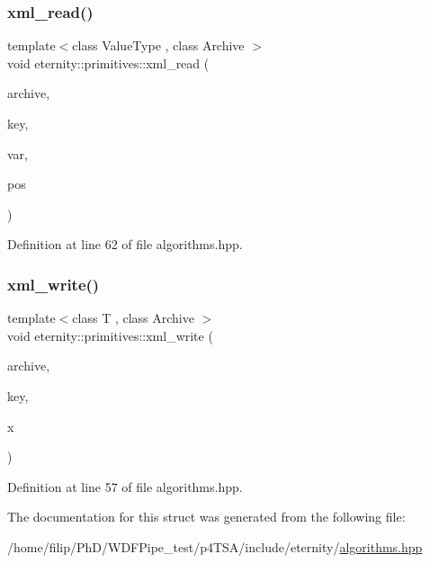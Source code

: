 \subsubsection{\texorpdfstring{xml\+\_\+read()}{xml\_read()}}
{\footnotesize\ttfamily template$<$class Value\+Type , class Archive $>$ \\
void eternity\+::primitives\+::xml\+\_\+read (\begin{DoxyParamCaption}\item[{Archive \&}]{archive,  }\item[{std\+::string}]{key,  }\item[{Value\+Type $\ast$}]{var,  }\item[{size\+\_\+t}]{pos }\end{DoxyParamCaption})}



Definition at line 62 of file algorithms.\+hpp.

\mbox{\label{structeternity_1_1primitives_af5a6a3550f36eb25ad9372989614f162}} 
\subsubsection{\texorpdfstring{xml\+\_\+write()}{xml\_write()}}
{\footnotesize\ttfamily template$<$class T , class Archive $>$ \\
void eternity\+::primitives\+::xml\+\_\+write (\begin{DoxyParamCaption}\item[{Archive \&}]{archive,  }\item[{std\+::string}]{key,  }\item[{T \&}]{x }\end{DoxyParamCaption})}



Definition at line 57 of file algorithms.\+hpp.



The documentation for this struct was generated from the following file\+:\begin{DoxyCompactItemize}
\item 
/home/filip/\+Ph\+D/\+W\+D\+F\+Pipe\+\_\+test/p4\+T\+S\+A/include/eternity/\hyperlink{algorithms_8hpp}{algorithms.\+hpp}\end{DoxyCompactItemize}
